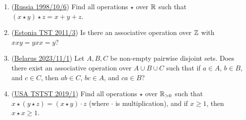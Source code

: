 \documentclass[11pt,paper=letter]{scrartcl}
\begin{document}
\begin{enumerate}

\item (\href{https://artofproblemsolving.com/community/c6h505761p2841005}{Russia 1998/10/6}) Find all operations $\star$ over $\mathbb R$ such that $(x \star y) \star z = x + y + z$.

\item (\href{https://artofproblemsolving.com/community/c6h422571p2388880}{Estonia TST 2011/3}) Is there an associative operation over $\mathbb Z$ with $xxy = yxx = y$?

\item (\href{https://artofproblemsolving.com/community/c6h3300188p30457791}{Belarus 2023/11/1}) Let $A, B, C$ be non-empty pairwise disjoint sets. Does there exist an associative operation over $A \cup B \cup C$ such that if $a \in A$, $b \in B$, and $c \in C$, then $ab \in C$, $bc \in A$, and $ca \in B$?

\item (\href{https://artofproblemsolving.com/community/c6h1863157p12608849}{USA TSTST 2019/1}) Find all operations $\star$ over $\mathbb R_{> 0}$ such that $x \star (y \star z) = (x \star y) \cdot z$ (where $\cdot$ is multiplication), and if $x \ge 1$, then $x \star x \ge 1$.
%
%
%
%
%


\end{enumerate}
\end{document}
